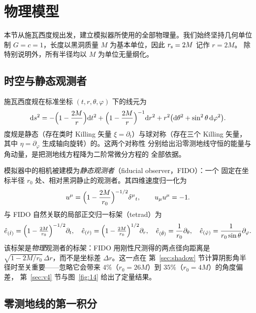 \section{物理模型}\label{sec:theory}

本节从施瓦西度规出发，建立模拟器所使用的全部物理量。我们始终坚持几何单位制
$G=c=1$，长度以黑洞质量 $M$ 为基本单位，因此 $r_{\mathrm s}=2M$ 记作 $r=2M$。
除特别说明外，所有半径均以 $M$ 为单位无量纲化。

\subsection{时空与静态观测者}\label{sec:metric}

施瓦西度规在标准坐标 $(t,r,\theta,\varphi)$ 下的线元为
\begin{equation}
\mathrm{d} s^{2}=-\Bigl(1-\frac{2M}{r}\Bigr)\mathrm{d} t^{2}
+\Bigl(1-\frac{2M}{r}\Bigr)^{-1}\mathrm{d} r^{2}
+r^{2}\bigl(\mathrm{d}\theta^{2}+\sin^{2}\theta\,\mathrm{d}\varphi^{2}\bigr).
\label{eq:schw}
\end{equation}
度规是静态（存在类时 Killing 矢量 $\xi=\partial_{t}$）与球对称（存在三个
Killing 矢量，其中 $\eta=\partial_{\varphi}$ 生成轴向旋转）的。这两个对称性
分别给出沿零测地线守恒的能量与角动量，是把测地线方程降为二阶常微分方程的
全部依据。

模拟器中的相机被建模为\emph{静态观测者}（fiducial observer，FIDO）：一个
固定在坐标半径 $r_{0}$ 处、相对黑洞静止的观测者。其四维速度归一化为
\begin{equation}
u^{\mu}=\Bigl(1-\frac{2M}{r_{0}}\Bigr)^{-1/2}\delta^{\mu}{}_{t},
\qquad
u_{\mu}u^{\mu}=-1 .
\label{eq:fido}
\end{equation}
与 FIDO 自然关联的局部正交归一标架（tetrad）为
\begin{equation}
\hat e_{(\hat t)}=\Bigl(1-\tfrac{2M}{r_{0}}\Bigr)^{-1/2}\partial_{t},\quad
\hat e_{(\hat r)}=\Bigl(1-\tfrac{2M}{r_{0}}\Bigr)^{1/2}\partial_{r},\quad
\hat e_{(\hat\theta)}=\frac{1}{r_{0}}\partial_{\theta},\quad
\hat e_{(\hat\varphi)}=\frac{1}{r_{0}\sin\theta}\partial_{\varphi}.
\label{eq:tetrad}
\end{equation}
该标架是\emph{物理}观测者的标架：FIDO 用刚性尺测得的两点径向距离是
$\sqrt{1-2M/r_{0}}\,\Delta r$，而不是坐标差 $\Delta r$。这一点在
第~\ref{sec:shadow} 节计算阴影角半径时至关重要——忽略它会带来
$4\%$（$r_{0}=26M$）到 $35\%$（$r_{0}=4M$）的角度偏差，
第~\ref{sec:v4} 节与图~\ref{fig:14} 给出了定量结果。

\subsection{零测地线的第一积分}\label{sec:firstintegral}

